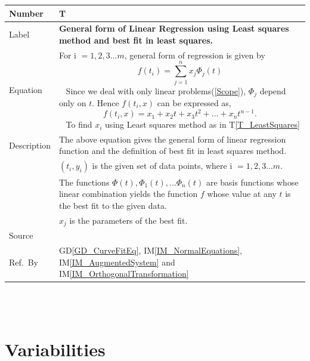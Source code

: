 \documentclass[12pt]{article}
\newcommand{\colAwidth}{0.13\textwidth}
\newcommand{\colBwidth}{0.82\textwidth}
\newcommand{\dref}[1]{GD\ref{#1}}
\newcounter{theorynum} %
\newcommand{\tref}[1]{T\ref{#1}}
\newcommand{\iref}[1]{IM\ref{#1}}
\begin{document}
\begin{minipage}{\textwidth}
	\renewcommand*{\arraystretch}{1.5}
	\begin{tabular}{| p{\colAwidth} | p{\colBwidth}|}
		\hline
		\rowcolor[gray]{0.9}
		Number& T{theorynum}\thetheorynum \label{T_LinearRegression}\\
		\hline
		Label&\bf General form of Linear Regression using Least squares method and best fit in least squares. \\
		\hline
		Equation&  For i $= 1,2,3...m$, general form of regression is given by
		\begin{equation*}
		f(t_i) = \sum_{j=1}^{n}x_j \Phi_j (t)	
		\end{equation*} 
		~\newline
		Since we deal with only linear problems(\ref{Scope}), $\Phi_j$ depend only on $t$. Hence $f(t_i,x) $ can be expressed as,
		\begin{equation*}
		f(t_i,x) = x_1 + x_2 t + x_3 t^{2} + ... + x_n t^{n-1}.
		\end{equation*}
		~\newline
		To find $x_i$ using Least squares method as in \tref{T_LeastSquares}\\
		\hline
		Description & 
		The above equation gives the general form of linear regression function and the definition of best fit in least squares method.\\
		
		&$(t_i,y_i)$ is the given set of data points, where i $= 1,2, 3...m$.\\
		&The functions $\Phi(t), \Phi_1(t), ... \Phi_n(t)$ are basis functions whose linear combination yields the function $f$ whose value at any $t$ is the best fit to the given data.\\
		&$x_j$ is the parameters of the best fit.\\
		\hline
		Source & ~\cite{Health1997}\\
		
		\hline
		Ref.\ By & \dref{GD_CurveFitEq}, \iref{IM_NormalEquations}, \iref{IM_AugmentedSystem} and \iref{IM_OrthogonalTransformation}\\
		\hline
	\end{tabular}
\end{minipage}\\

~\newline

\section{Variabilities}
\end{document}
